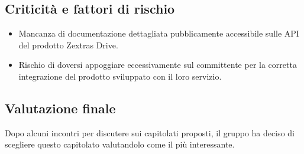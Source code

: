 \subsection{Criticità e fattori di rischio}
\begin{itemize}
\item Mancanza di documentazione dettagliata pubblicamente accessibile sulle API del prodotto Zextras Drive.
\item Rischio di doversi appoggiare eccessivamente sul committente per la corretta integrazione del prodotto sviluppato con il loro servizio.
\end{itemize}

\subsection{Valutazione finale}
Dopo alcuni incontri per discutere sui capitolati proposti, il gruppo \Gruppo{} ha deciso di scegliere questo capitolato valutandolo come il più interessante.